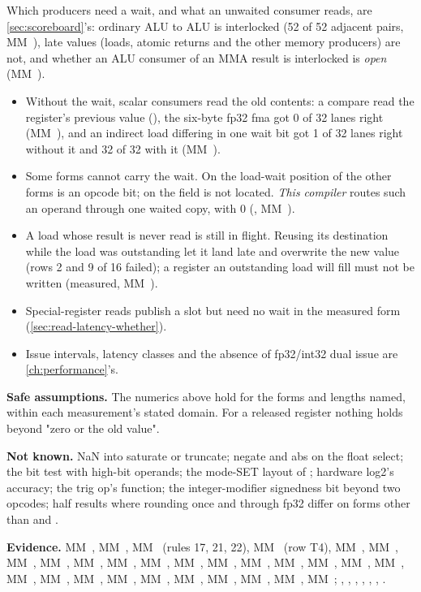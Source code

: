 Which producers need a wait, and what an unwaited consumer reads, are \cref{sec:scoreboard}'s: ordinary ALU to ALU is interlocked
(52 of 52 adjacent pairs, MM~), late values (loads, atomic returns and the other memory producers) are not, and
whether an ALU consumer of an MMA result is interlocked is \emph{open} (MM~).

\begin{itemize}
\item Without the wait, scalar consumers read the old contents: a compare read the register's previous value
  (), the six-byte fp32 fma got 0 of 32 lanes right (MM~), and an indirect load differing in
  one wait bit got 1 of 32 lanes right without it and 32 of 32 with it (MM~).
\item Some forms cannot carry the wait. On  the load-wait position
  of the other forms is an opcode bit; on  the field is not located. \emph{This compiler} routes
  such an operand through one waited copy,  with 0 (, MM~).
\item A load whose result is never read is still in flight. Reusing its destination while the load was outstanding let it land late and
  overwrite the new value (rows 2 and 9 of 16 failed); a register an outstanding load will fill must not be written
  (measured, MM~).
\item Special-register reads publish a slot but need no wait in the measured form (\cref{sec:read-latency-whether}).
\item Issue intervals, latency classes and the absence of fp32/int32 dual issue are \cref{ch:performance}'s.
\end{itemize}

\textbf{Safe assumptions.} The numerics above hold for the forms and lengths named, within each measurement's stated
domain. For a released register nothing holds beyond "zero or the old value".

\textbf{Not known.} NaN into saturate or truncate; negate and abs on the float select; the bit test with high-bit operands;
the mode-SET layout of ; hardware log2's accuracy; the trig op's
function; the integer-modifier signedness bit beyond two opcodes; half results where rounding once and through fp32 differ
on forms other than  and .

\textbf{Evidence.} MM~, MM~, MM~ (rules 17, 21, 22), MM~ (row T4), MM~, MM~, MM~, MM~, MM~,
MM~, MM~, MM~, MM~, MM~, MM~, MM~, MM~, MM~, MM~,
MM~, MM~, MM~, MM~, MM~, MM~, MM~, MM~, MM~;
, , , ,
, , .

